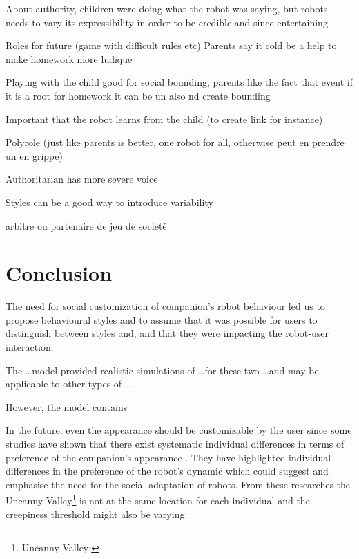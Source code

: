 \documentclass[a4paper,twocolumn]{svjour3}
\begin{document}
About authority, children were doing what the robot was saying, but robots needs to vary its expressibility in order to be credible and since entertaining


Roles for future (game with difficult rules etc)
Parents say it cold be a help to make homework more ludique

Playing with the child good for social bounding, parents like the fact that event if it is a root for homework it can be un also nd create bounding

Important that the robot learns from the child (to create link for instance)

Polyrole (just like parents is better, one robot for all, otherwise peut en prendre un en grippe)

Authoritarian has more severe voice

Styles can be a good way to introduce variability

arbitre ou partenaire de jeu de societé
\section{Conclusion}
The need for social customization of companion's robot behaviour led us to propose behavioural styles and to assume that it was possible for users to distinguish between styles and, and that they were impacting the robot-user interaction.

The \dots model provided realistic simulations of \dots for these two \dots and may be applicable to other types of \dots.



However, the model contains 



In the future, even the appearance should be customizable by the user since some studies have shown that there exist systematic individual differences in terms of preference of the companion's appearance \cite{Walters2008}. 
They have highlighted individual differences in the preference of the robot's dynamic which could suggest and emphasise the need for the social adaptation of robots. 
From these researches the Uncanny Valley\footnote{Uncanny Valley:} is not at the same location for each individual and the creepiness threshold might also be varying. 
\end{document}

